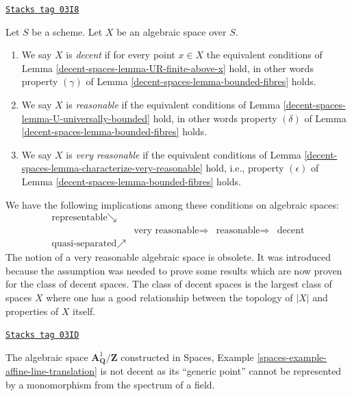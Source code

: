 \begin{definition}
\label{decent-spaces-definition-very-reasonable}
\href{https://stacks.math.columbia.edu/tag/03I8}{\texttt{Stacks tag 03I8}}

Let $S$ be a scheme.
Let $X$ be an algebraic space over $S$.
\begin{enumerate}
\item We say $X$ is {\it decent} if for every point $x \in X$ the equivalent
conditions of
Lemma \ref{decent-spaces-lemma-UR-finite-above-x}
hold, in other words property $(\gamma)$ of
Lemma \ref{decent-spaces-lemma-bounded-fibres}
holds.
\item We say $X$ is {\it reasonable} if the equivalent conditions of
Lemma \ref{decent-spaces-lemma-U-universally-bounded}
hold, in other words property $(\delta)$ of
Lemma \ref{decent-spaces-lemma-bounded-fibres}
holds.
\item We say $X$ is {\it very reasonable} if the equivalent conditions of
Lemma \ref{decent-spaces-lemma-characterize-very-reasonable}
hold, i.e., property $(\epsilon)$ of
Lemma \ref{decent-spaces-lemma-bounded-fibres}
holds.
\end{enumerate}
\end{definition}

We have the following implications among these conditions on algebraic spaces:
$$
\begin{array}{cccc}\text{representable} \searrow &  &  &  \\  & \text{very reasonable} \Longrightarrow & \text{reasonable} \Longrightarrow & \text{decent} \\ \text{quasi-separated} \nearrow &  &  & \end{array}
$$
The notion of a very reasonable algebraic space is obsolete.
It was introduced because the assumption was needed to prove some results
which are now proven for the class of decent spaces.
The class of decent spaces is the largest class of spaces $X$ where one has
a good relationship between the topology of $|X|$ and
properties of $X$ itself.

\begin{example}
\label{decent-spaces-example-not-decent}
\href{https://stacks.math.columbia.edu/tag/03ID}{\texttt{Stacks tag 03ID}}

The algebraic space $\mathbf{A}^1_{\mathbf{Q}}/\mathbf{Z}$ constructed in
Spaces, Example \ref{spaces-example-affine-line-translation}
is not decent as its ``generic point'' cannot be represented by a monomorphism
from the spectrum of a field.
\end{example}

